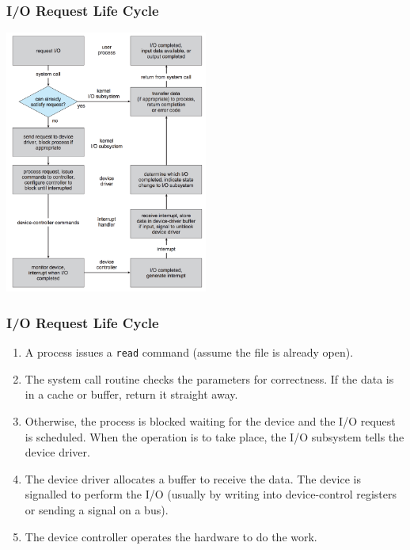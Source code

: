 \begin{frame}
\frametitle{I/O Request Life Cycle}

\begin{center}
	\includegraphics[width=0.5\textwidth]{images/io-lifecycle.png}
\end{center}

\end{frame}

\begin{frame}
\frametitle{I/O Request Life Cycle}

\begin{enumerate}
	\item A process issues a \texttt{read} command (assume the file is already open).
	\item The system call routine checks the parameters for correctness. If the data is in a cache or buffer, return it straight away.
	\item Otherwise, the process is blocked waiting for the device and the I/O request is scheduled. When the operation is to take place, the I/O subsystem tells the device driver.
	\item The device driver allocates a buffer to receive the data. The device is signalled to perform the I/O (usually by writing into device-control registers or sending a signal on a bus).
	\item The device controller operates the hardware to do the work.
\end{enumerate}

\end{frame}

